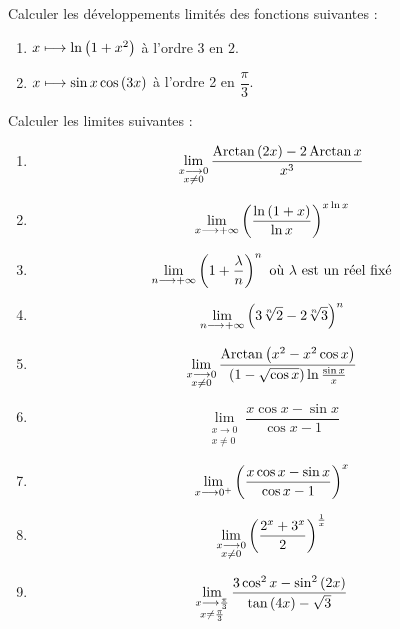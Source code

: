 \begin{corr}
\end{corr}

\begin{exo}
Calculer les développements limités des fonctions suivantes :

\begin{enumerate}
\item \(x\longmapsto\ln\left(1+x^2\right)\) à l'ordre 3 en \(2\). \\

\item \(x\longmapsto\sin x\cos\left(3x\right)\) à l'ordre 2 en \(\dfrac{\pi}{3}\).
\end{enumerate}
\end{exo}

\begin{corr}
\end{corr}

\begin{exo}
Calculer les limites suivantes :

\begin{enumerate}
\item \[\lim_{\substack{x\longrightarrow0 \\ x\not=0}}\dfrac{\operatorname{Arctan}\left(2x\right)-2\operatorname{Arctan} x}{x^3}\]

\item \[\lim_{x\longrightarrow+\infty}\left(\dfrac{\ln\left(1+x\right)}{\ln x}\right)^{x\ln x}\]

\item \[\lim_{n\longrightarrow+\infty}\left(1+\dfrac{\lambda}{n}\right)^n\text{ où \(\lambda\) est un réel fixé}\]

\item \[\lim_{n\longrightarrow+\infty}\left(3\sqrt[n]{2}-2\sqrt[n]{3}\right)^n\]

\item \[\lim_{\substack{x\longrightarrow0 \\ x\not=0}}\dfrac{\operatorname{Arctan}\left(x^2-x^2\cos x\right)}{\left(1-\sqrt{\cos x}\right)\ln\frac{\sin x}{x}}\]

\item \[\lim_{\substack{x\to0 \\ x\not=0}}\dfrac{x\cos x-\sin x}{\cos x-1}\]

\item \[\lim_{x\longrightarrow0^+}\left(\dfrac{x\cos x-\sin x}{\cos x-1}\right)^x\]

\item \[\lim_{\substack{x\longrightarrow0 \\ x\not=0}}\left(\dfrac{2^x+3^x}{2}\right)^{\frac{1}{x}}\]

\item \[\lim_{\substack{x\longrightarrow\frac{\pi}{3} \\ x\not=\frac{\pi}{3}}}\dfrac{3\cos^2x-\sin^2\left(2x\right)}{\tan\left(4x\right)-\sqrt{3}}\]
\end{enumerate}
\end{exo}

